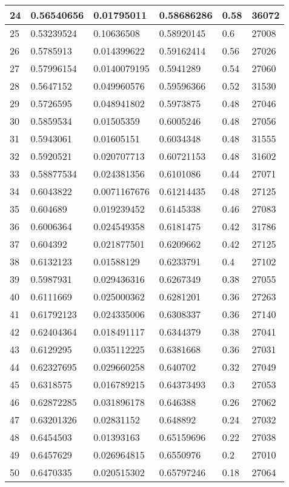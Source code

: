 \begin{longtable}{|l|l|l|l|l|l|}
24 & 0.56540656 & 0.01795011 & 0.58686286 & 0.58 & 36072 \\ \hline 
25 & 0.53239524 & 0.10636508 & 0.58920145 & 0.6 & 27008 \\ \hline 
26 & 0.5785913 & 0.014399622 & 0.59162414 & 0.56 & 27026 \\ \hline 
27 & 0.57996154 & 0.0140079195 & 0.5941289 & 0.54 & 27060 \\ \hline 
28 & 0.5647152 & 0.049960576 & 0.59596366 & 0.52 & 31530 \\ \hline 
29 & 0.5726595 & 0.048941802 & 0.5973875 & 0.48 & 27046 \\ \hline 
30 & 0.5859534 & 0.01505359 & 0.6005246 & 0.48 & 27056 \\ \hline 
31 & 0.5943061 & 0.01605151 & 0.6034348 & 0.48 & 31555 \\ \hline 
32 & 0.5920521 & 0.020707713 & 0.60721153 & 0.48 & 31602 \\ \hline 
33 & 0.58877534 & 0.024381356 & 0.6101086 & 0.44 & 27071 \\ \hline 
34 & 0.6043822 & 0.0071167676 & 0.61214435 & 0.48 & 27125 \\ \hline 
35 & 0.604689 & 0.019239452 & 0.6145338 & 0.46 & 27083 \\ \hline 
36 & 0.6006364 & 0.024549358 & 0.6181475 & 0.42 & 31786 \\ \hline 
37 & 0.604392 & 0.021877501 & 0.6209662 & 0.42 & 27125 \\ \hline 
38 & 0.6132123 & 0.01588129 & 0.6233791 & 0.4 & 27102 \\ \hline 
39 & 0.5987931 & 0.029436316 & 0.6267349 & 0.38 & 27055 \\ \hline 
40 & 0.6111669 & 0.025000362 & 0.6281201 & 0.36 & 27263 \\ \hline 
41 & 0.61792123 & 0.024335006 & 0.6308337 & 0.36 & 27140 \\ \hline 
42 & 0.62404364 & 0.018491117 & 0.6344379 & 0.38 & 27041 \\ \hline 
43 & 0.6129295 & 0.035112225 & 0.6381668 & 0.36 & 27031 \\ \hline 
44 & 0.62327695 & 0.029660258 & 0.640702 & 0.32 & 27049 \\ \hline 
45 & 0.6318575 & 0.016789215 & 0.64373493 & 0.3 & 27053 \\ \hline 
46 & 0.62872285 & 0.031896178 & 0.646388 & 0.26 & 27062 \\ \hline 
47 & 0.63201326 & 0.02831152 & 0.648892 & 0.24 & 27032 \\ \hline 
48 & 0.6454503 & 0.01393163 & 0.65159696 & 0.22 & 27038 \\ \hline 
49 & 0.6457629 & 0.026964815 & 0.6550976 & 0.2 & 27010 \\ \hline 
50 & 0.6470335 & 0.020515302 & 0.65797246 & 0.18 & 27064 \\ \hline 
\end{longtable}